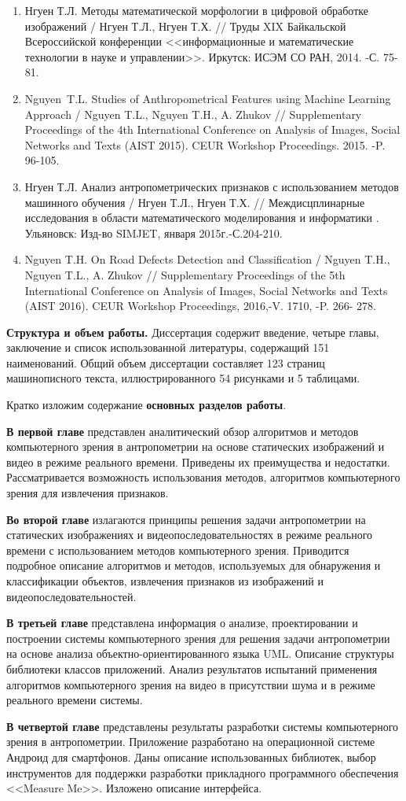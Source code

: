 \begin{enumerate}
\item Нгуен Т.Л. Методы математической морфологии в цифровой обработке изображений / Нгуен Т.Л., Нгуен Т.Х. // Труды XIX Байкальской Всероссийской конференции <<информационные и математические технологии в науке и управлении>>. Иркутск: ИСЭМ СО РАН, 2014. -С. 75-81.
\item  Nguyen~T.L. Studies of Anthropometrical Features using Machine Learning Approach / Nguyen T.L., Nguyen T.H., A. Zhukov // Supplementary Proceedings of the 4th International Conference on Analysis of Images, Social Networks and Texts (AIST 2015). CEUR Workshop Proceedings. 2015. -P. 96-105.
\item Нгуен Т.Л. Анализ антропометрических признаков с использованием методов машинного обучения / Нгуен Т.Л., Нгуен Т.Х. // Междисцплинарные исследования в области математического моделирования и информатики . Ульяновск: Изд-во SIMJET, января 2015г.-С.204-210.
\item Nguyen T.H. On Road Defects Detection and Classification / Nguyen T.H., Nguyen T.L., A. Zhukov // Supplementary Proceedings of the 5th International Conference on Analysis of Images, Social Networks and Texts (AIST 2016). CEUR Workshop Proceedings, 2016,-V. 1710, -P. 266- 278.
\end{enumerate}


\textbf{Структура и объем работы.} Диссертация содержит введение, четыре главы, заключение и список использованной литературы, содержащий 151 наименований. Общий объем диссертации составляет 123 страниц машинописного текста, иллюстрированного 54 рисунками и 5 таблицами.

Кратко изложим содержание \textbf{основных разделов работы}.

\textbf{В первой главе} представлен аналитический обзор алгоритмов и методов компьютерного зрения в антропометрии на основе статических изображений и видео в режиме реального времени. Приведены их преимущества и недостатки. Рассматривается возможность использования методов, алгоритмов компьютерного зрения для извлечения признаков.

\textbf{Во второй главе} излагаются принципы решения задачи антропометрии на статических изображениях и видеопоследовательностях в режиме реального времени с использованием методов компьютерного зрения. Приводится подробное описание алгоритмов и методов, используемых для обнаружения и классификации объектов, извлечения признаков из изображений и видеопоследовательностей.

\textbf{В третьей главе} представлена информация о анализе, проектировании и построении системы компьютерного зрения для решения задачи антропометрии на основе анализа объектно-ориентированного языка UML. Описание структуры библиотеки классов приложений. Анализ результатов испытаний применения алгоритмов компьютерного зрения на видео в присутствии шума и в режиме реального времени системы.

\textbf{В четвертой главе} представлены результаты разработки системы компьютерного зрения в антропометрии. Приложение разработано на операционной системе Андроид для смартфонов. Даны описание использованных библиотек, выбор инструментов для поддержки разработки прикладного программного обеспечения <<Measure Me>>. Изложено описание интерфейса.
